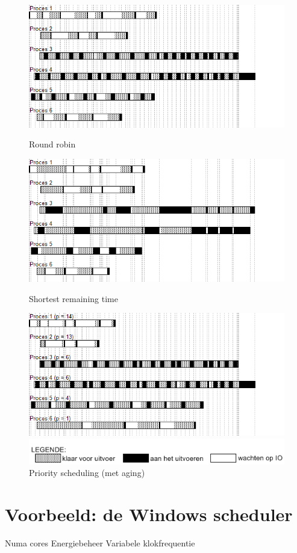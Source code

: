\begin{figure}
\centering
  \includegraphics[width=\linewidth]{images/schedule_rr.png}
  \caption{Round robin}
  \label{fig:schedfcfs}
  \centering
  \includegraphics[width=\linewidth]{images/schedule_srt.png}
  \caption{Shortest remaining time}
  \label{fig:schedsjf}
  \centering
  \includegraphics[width=\linewidth]{images/schedule_ps_qua_age.png}
  \caption{Priority scheduling (met aging)}
  \label{fig:schedpsnopre}
  \includegraphics[width=0.8\linewidth]{images/legende.png}
\end{figure}


\section{Voorbeeld: de Windows scheduler}


Numa cores
Energiebeheer
Variabele klokfrequentie

